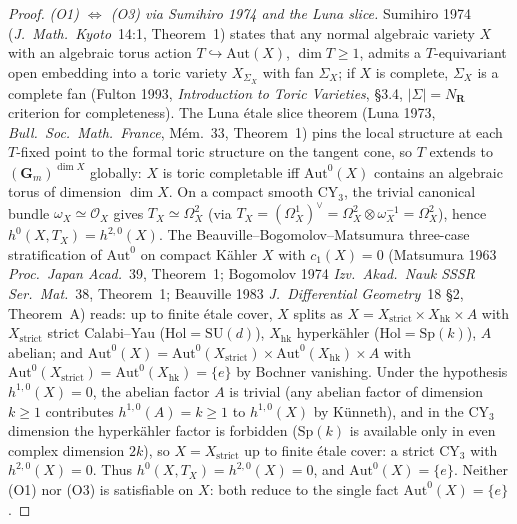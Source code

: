 \begin{proof}
\emph{(O1) $\Leftrightarrow$ (O3) via Sumihiro 1974 and the Luna slice.}
Sumihiro 1974 (\emph{J.\ Math.\ Kyoto}~14:1, Theorem~1) states that
any normal algebraic variety $X$ with an algebraic torus action
$T \hookrightarrow \mathrm{Aut}(X)$, $\dim T \geq 1$, admits a
$T$-equivariant open embedding into a toric variety $X_{\Sigma_X}$ with
fan $\Sigma_X$; if $X$ is complete, $\Sigma_X$ is a complete
fan (Fulton 1993, \emph{Introduction to Toric Varieties}, \S 3.4,
$|\Sigma| = N_\mathbf R$ criterion for completeness). The Luna \'etale
slice theorem (Luna 1973, \emph{Bull.\ Soc.\ Math.\ France}, M\'em.~33,
Theorem~1) pins the local structure at each $T$-fixed point to the
formal toric structure on the tangent cone, so $T$ extends to
$(\mathbf G_m)^{\dim X}$ globally: $X$ is toric completable iff
$\mathrm{Aut}^0(X)$ contains an algebraic torus of dimension
$\dim X$. On a compact smooth CY$_3$, the trivial canonical bundle
$\omega_X \simeq \mathcal O_X$ gives $T_X \simeq \Omega^2_X$
(via $T_X = (\Omega^1_X)^\vee = \Omega^2_X \otimes \omega_X^{-1}
= \Omega^2_X$), hence $h^0(X, T_X) = h^{2,0}(X)$. The
Beauville--Bogomolov--Matsumura three-case stratification of
$\mathrm{Aut}^0$ on compact K\"ahler $X$ with $c_1(X) = 0$
(Matsumura 1963 \emph{Proc.\ Japan Acad.}~39, Theorem~1;
Bogomolov 1974 \emph{Izv.\ Akad.\ Nauk SSSR Ser.\ Mat.}~38,
Theorem~1; Beauville 1983 \emph{J.\ Differential Geometry}~18 \S 2,
Theorem~A) reads: up to finite \'etale cover, $X$ splits as
$X = X_{\mathrm{strict}} \times X_{\mathrm{hk}} \times A$ with
$X_{\mathrm{strict}}$ strict Calabi--Yau ($\mathrm{Hol} = \mathrm{SU}
(d)$), $X_{\mathrm{hk}}$ hyperk\"ahler ($\mathrm{Hol} = \mathrm{Sp}(k)$),
$A$ abelian; and $\mathrm{Aut}^0(X) = \mathrm{Aut}^0(X_{\mathrm{strict}})
\times \mathrm{Aut}^0(X_{\mathrm{hk}}) \times A$ with
$\mathrm{Aut}^0(X_{\mathrm{strict}}) = \mathrm{Aut}^0(X_{\mathrm{hk}}) =
\{e\}$ by Bochner vanishing. Under the hypothesis $h^{1,0}(X) = 0$,
the abelian factor $A$ is trivial (any abelian factor of dimension
$k \geq 1$ contributes $h^{1,0}(A) = k \geq 1$ to $h^{1,0}(X)$ by
K\"unneth), and in the CY$_3$ dimension the hyperk\"ahler factor is
forbidden ($\mathrm{Sp}(k)$ is available only in even complex
dimension $2k$), so $X = X_{\mathrm{strict}}$ up to finite \'etale
cover: a strict CY$_3$ with $h^{2,0}(X) = 0$. Thus $h^0(X, T_X) =
h^{2,0}(X) = 0$, and $\mathrm{Aut}^0(X) = \{e\}$. Neither (O1) nor
(O3) is satisfiable on $X$: both reduce to the single fact
$\mathrm{Aut}^0(X) = \{e\}$.


\end{proof}
